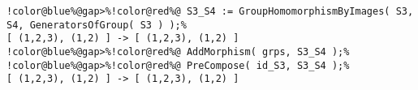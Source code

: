 \begin{Verbatim}[commandchars=!@\%,frame=single]
!color@blue%@gap>%!color@red%@ S3_S4 := GroupHomomorphismByImages( S3, S4, GeneratorsOfGroup( S3 ) );%
[ (1,2,3), (1,2) ] -> [ (1,2,3), (1,2) ]
!color@blue%@gap>%!color@red%@ AddMorphism( grps, S3_S4 );%
!color@blue%@gap>%!color@red%@ PreCompose( id_S3, S3_S4 );%
[ (1,2,3), (1,2) ] -> [ (1,2,3), (1,2) ]
\end{Verbatim}
